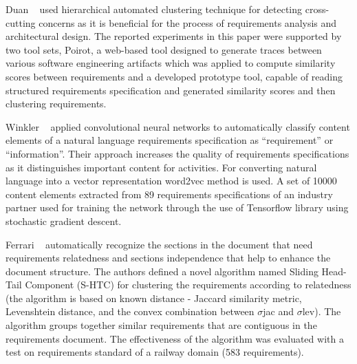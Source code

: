 	Duan \etal~\cite{Duan:2007} used hierarchical automated clustering technique for detecting cross-cutting concerns as it is beneficial for the process of requirements analysis and architectural design. The reported experiments in this paper were supported by two tool sets, Poirot, a web-based tool designed to generate traces between various software engineering artifacts which was applied to compute similarity scores between requirements and a developed prototype tool, capable of reading structured requirements specification and generated similarity scores and then clustering requirements. 

	 Winkler \etal~\cite{Winkler:2016} applied convolutional neural networks to automatically classify content elements of a natural language requirements specification as “requirement” or “information”. Their approach increases the quality of requirements specifications as it distinguishes important content for activities. For converting natural language into a vector representation word2vec method is used. A set of 10000 content elements extracted from 89 requirements specifications of an industry partner used for training the network through the use of Tensorflow library using stochastic gradient descent. 

 Ferrari \etal~\cite{Ferrari:2013} automatically recognize the sections in the document that need requirements relatedness and sections independence that help to enhance the document structure. The authors defined a novel algorithm named Sliding Head-Tail Component (S-HTC) for clustering the requirements according to relatedness (the algorithm is based on known distance - Jaccard similarity metric, Levenshtein distance, and the convex combination between $\sigma$jac and $\sigma$lev). The algorithm groups together similar requirements that are contiguous in the requirements document. The effectiveness of the algorithm was evaluated with a test on requirements standard of a railway domain (583 requirements). 

